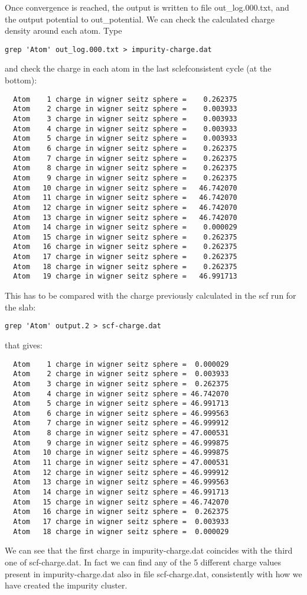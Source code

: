 \documentclass[a4paper,10pt,fullpage]{report}
\begin{document}
Once convergence is reached, the output is written to
file out\_log.000.txt, and the output potential
to out\_potential.
We can check the calculated charge density around each atom.
Type 
\begin{verbatim}
grep 'Atom' out_log.000.txt > impurity-charge.dat
\end{verbatim}
and check the charge in each atom in the last sclefconsistent cycle (at the bottom):
\begin{verbatim}
  Atom    1 charge in wigner seitz sphere =    0.262375
  Atom    2 charge in wigner seitz sphere =    0.003933
  Atom    3 charge in wigner seitz sphere =    0.003933
  Atom    4 charge in wigner seitz sphere =    0.003933
  Atom    5 charge in wigner seitz sphere =    0.003933
  Atom    6 charge in wigner seitz sphere =    0.262375
  Atom    7 charge in wigner seitz sphere =    0.262375
  Atom    8 charge in wigner seitz sphere =    0.262375
  Atom    9 charge in wigner seitz sphere =    0.262375
  Atom   10 charge in wigner seitz sphere =   46.742070
  Atom   11 charge in wigner seitz sphere =   46.742070
  Atom   12 charge in wigner seitz sphere =   46.742070
  Atom   13 charge in wigner seitz sphere =   46.742070
  Atom   14 charge in wigner seitz sphere =    0.000029
  Atom   15 charge in wigner seitz sphere =    0.262375
  Atom   16 charge in wigner seitz sphere =    0.262375
  Atom   17 charge in wigner seitz sphere =    0.262375
  Atom   18 charge in wigner seitz sphere =    0.262375
  Atom   19 charge in wigner seitz sphere =   46.991713
\end{verbatim}
This has to be compared with the charge previously calculated in the scf run for the slab:
\begin{verbatim}
grep 'Atom' output.2 > scf-charge.dat
\end{verbatim}
that gives:
\begin{verbatim}
  Atom    1 charge in wigner seitz sphere =  0.000029
  Atom    2 charge in wigner seitz sphere =  0.003933
  Atom    3 charge in wigner seitz sphere =  0.262375
  Atom    4 charge in wigner seitz sphere = 46.742070
  Atom    5 charge in wigner seitz sphere = 46.991713
  Atom    6 charge in wigner seitz sphere = 46.999563
  Atom    7 charge in wigner seitz sphere = 46.999912
  Atom    8 charge in wigner seitz sphere = 47.000531
  Atom    9 charge in wigner seitz sphere = 46.999875
  Atom   10 charge in wigner seitz sphere = 46.999875
  Atom   11 charge in wigner seitz sphere = 47.000531
  Atom   12 charge in wigner seitz sphere = 46.999912
  Atom   13 charge in wigner seitz sphere = 46.999563
  Atom   14 charge in wigner seitz sphere = 46.991713
  Atom   15 charge in wigner seitz sphere = 46.742070
  Atom   16 charge in wigner seitz sphere =  0.262375
  Atom   17 charge in wigner seitz sphere =  0.003933
  Atom   18 charge in wigner seitz sphere =  0.000029
\end{verbatim}
We can see that the first charge in impurity-charge.dat
coincides with the third one of scf-charge.dat. In fact
we can find any of the 5 different charge values present in 
impurity-charge.dat also in file scf-charge.dat, consistently with 
how we have created the impurity cluster.  
\end{document}
